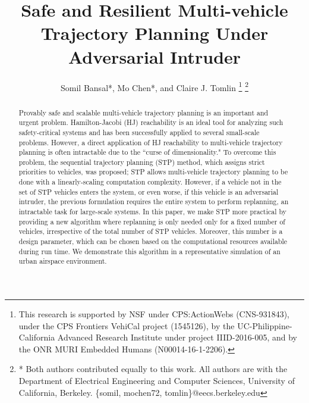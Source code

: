 \documentclass[journal]{IEEEtran}
\title{\LARGE \bf Safe and Resilient Multi-vehicle Trajectory Planning Under Adversarial Intruder}
\author{Somil Bansal*, Mo Chen*, and Claire J. Tomlin
\thanks{This research is supported by NSF under CPS:ActionWebs (CNS-931843), under the CPS Frontiers VehiCal project (1545126), by the UC-Philippine-California Advanced Research Institute under project IIID-2016-005, and by the ONR MURI Embedded Humans (N00014-16-1-2206).}
\thanks{* Both authors contributed equally to this work. All authors are with the Department of Electrical Engineering and Computer Sciences, University of California, Berkeley. \{somil, mochen72, tomlin\}@eecs.berkeley.edu}
}
\begin{document}
\maketitle
\thispagestyle{empty}
\pagestyle{empty}

\begin{abstract}
Provably safe and scalable multi-vehicle trajectory planning is an important and urgent problem. Hamilton-Jacobi (HJ) reachability is an ideal tool for analyzing such safety-critical systems and has been successfully applied to several small-scale problems. However, a direct application of HJ reachability to multi-vehicle trajectory planning is often intractable due to the ``curse of dimensionality." To overcome this problem, the sequential trajectory planning (STP) method, which assigns strict priorities to vehicles, was proposed; STP allows multi-vehicle trajectory planning to be done with a linearly-scaling computation complexity. However, if a vehicle not in the set of STP vehicles enters the system, or even worse, if this vehicle is an adversarial intruder, the previous formulation requires the entire system to perform replanning, an intractable task for large-scale systems. In this paper, we make STP more practical by providing a new algorithm where replanning is only needed only for a fixed number of vehicles, irrespective of the total number of STP vehicles. Moreover, this number is a design parameter, which can be chosen based on the computational resources available during run time. We demonstrate this algorithm in a representative simulation of an urban airspace environment.    
\end{abstract}









%


























\end{document}
